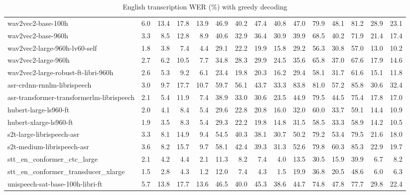 \begin{table}[H]
\begin{tabular}{l|rrrrrrrrrrrrrr}
\\
\midrule
wav2vec2-base-100h 
& 6.0 & 13.4 & 17.8 & 13.9 & 46.9 & 40.2 & 47.4 & 40.8 & 47.0 & 79.9 & 48.1 & 81.2 & 28.9 & 23.1 
\\
wav2vec2-base-960h 
& 3.3 & 8.5 & 12.8 & 8.9 & 40.6 & 32.9 & 36.4 & 30.9 & 39.9 & 68.5 & 40.2 & 71.9 & 21.4 & 17.4 
\\
wav2vec2-large-960h-lv60-self 
& 1.8 & 3.8 & 7.4 & 4.4 & 29.1 & 22.2 & 19.9 & 15.8 & 29.2 & 56.3 & 30.8 & 57.0 & 13.0 & 10.2 
\\
wav2vec2-large-960h 
& 2.7 & 6.2 & 10.5 & 7.7 & 34.8 & 28.3 & 29.9 & 24.5 & 35.6 & 65.8 & 37.0 & 67.6 & 17.9 & 14.6 
\\
wav2vec2-large-robust-ft-libri-960h 
& 2.6 & 5.3 & 9.2 & 6.1 & 23.4 & 19.8 & 20.3 & 16.2 & 29.4 & 58.1 & 31.7 & 61.6 & 15.1 & 11.8 
\\
asr-crdnn-rnnlm-librispeech 
& 3.0 & 9.7 & 17.7 & 10.7 & 59.7 & 56.1 & 43.7 & 33.3 & 83.8 & 81.0 & 57.2 & 85.8 & 30.6 & 32.4 
\\
asr-transformer-transformerlm-librispeech 
& 2.1 & 5.4 & 11.9 & 7.4 & 38.9 & 33.0 & 30.6 & 23.5 & 44.9 & 79.5 & 44.5 & 75.4 & 17.8 & 17.0 
\\
hubert-large-ls960-ft 
& 2.0 & 4.1 & 8.4 & 5.4 & 29.6 & 22.8 & 20.8 & 16.0 & 32.0 & 60.0 & 33.7 & 59.1 & 14.4 & 10.9 
\\
hubert-xlarge-ls960-ft 
& 1.9 & 3.5 & 8.3 & 5.4 & 29.3 & 22.2 & 19.8 & 14.8 & 31.5 & 58.5 & 33.3 & 58.9 & 14.2 & 10.5 
\\
s2t-large-librispeech-asr 
& 3.3 & 8.1 & 14.9 & 9.4 & 54.5 & 40.3 & 38.1 & 30.7 & 50.2 & 79.2 & 53.4 & 79.5 & 21.6 & 18.0 
\\
s2t-medium-librispeech-asr 
& 3.6 & 8.2 & 15.7 & 9.7 & 58.1 & 42.4 & 39.3 & 31.3 & 52.6 & 79.8 & 60.3 & 85.3 & 22.9 & 19.7 
\\
stt\_en\_conformer\_ctc\_large 
& 2.1 & 4.2 & 4.4 & 2.1 & 11.3 & 8.2 & 7.4 & 4.0 & 13.5 & 30.5 & 15.9 & 39.9 & 6.7 & 8.2 
\\
stt\_en\_conformer\_transducer\_xlarge 
& 1.5 & 2.8 & 4.3 & 1.2 & 12.0 & 7.4 & 4.3 & 1.5 & 19.9 & 36.8 & 20.5 & 48.6 & 6.0 & 6.3 
\\
unispeech-sat-base-100h-libri-ft 
& 5.7 & 13.8 & 17.7 & 13.6 & 46.5 & 40.0 & 45.3 & 38.6 & 44.7 & 74.8 & 47.8 & 77.7 & 29.8 & 22.4 
\\
\bottomrule
\end{tabular}
\caption{English transcription WER (\%) with greedy decoding}\label{tab:english-asr-greedy}
\end{table}
